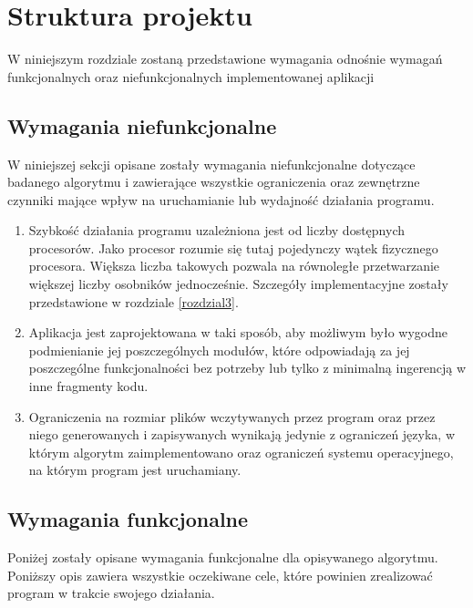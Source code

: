 \chapter{Struktura projektu}
\thispagestyle{chapterBeginStyle}
\label{rozdzial2}

W niniejszym rozdziale zostaną przedstawione wymagania odnośnie wymagań funkcjonalnych oraz niefunkcjonalnych implementowanej aplikacji 

\section{Wymagania niefunkcjonalne}
W niniejszej sekcji opisane zostały wymagania niefunkcjonalne dotyczące badanego algorytmu i zawierające wszystkie ograniczenia oraz zewnętrzne czynniki mające wpływ na uruchamianie lub wydajność działania programu.
\begin{enumerate}
    \item Szybkość działania programu uzależniona jest od liczby dostępnych procesorów. Jako procesor rozumie się tutaj pojedynczy wątek fizycznego procesora. Większa liczba takowych pozwala na równoległe przetwarzanie większej liczby osobników jednocześnie. Szczegóły implementacyjne zostały przedstawione w rozdziale \ref{rozdzial3}.
    \item Aplikacja jest zaprojektowana w taki sposób, aby możliwym było wygodne podmienianie jej poszczególnych modułów, które odpowiadają za jej poszczególne funkcjonalności bez potrzeby lub tylko z minimalną ingerencją w inne fragmenty kodu.
    \item Ograniczenia na rozmiar plików wczytywanych przez program oraz przez niego generowanych i zapisywanych wynikają jedynie z ograniczeń języka, w którym algorytm zaimplementowano oraz ograniczeń systemu operacyjnego, na którym program jest uruchamiany.
\end{enumerate}

\section{Wymagania funkcjonalne}
\label{sec:functional}
Poniżej zostały opisane wymagania funkcjonalne dla opisywanego algorytmu. Poniższy opis zawiera wszystkie oczekiwane cele, które powinien zrealizować program w trakcie swojego działania.


